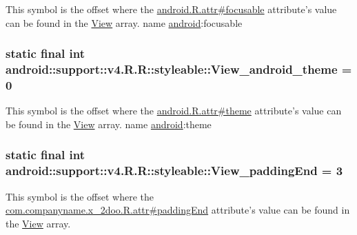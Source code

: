 This symbol is the offset where the \hyperlink{}{android.R.attr\#focusable} attribute's value can be found in the \hyperlink{classandroid_1_1support_1_1v4_1_1_r_1_1styleable_b4963d78f1fa8984188692ee48ea20d2}{View} array.  name \hyperlink{namespaceandroid}{android}:focusable \hypertarget{classandroid_1_1support_1_1v4_1_1_r_1_1styleable_26f4118fb592f19ebed8ecd1a890f65e}{
\subsubsection[{View\_\-android\_\-theme}]{\setlength{\rightskip}{0pt plus 5cm}static final int android::support::v4.R.R::styleable::View\_\-android\_\-theme = 0}}
\label{classandroid_1_1support_1_1v4_1_1_r_1_1styleable_26f4118fb592f19ebed8ecd1a890f65e}


This symbol is the offset where the \hyperlink{}{android.R.attr\#theme} attribute's value can be found in the \hyperlink{classandroid_1_1support_1_1v4_1_1_r_1_1styleable_b4963d78f1fa8984188692ee48ea20d2}{View} array.  name \hyperlink{namespaceandroid}{android}:theme \hypertarget{classandroid_1_1support_1_1v4_1_1_r_1_1styleable_d641d27f14bbb0e085ee8f2086bfe3ee}{
\subsubsection[{View\_\-paddingEnd}]{\setlength{\rightskip}{0pt plus 5cm}static final int android::support::v4.R.R::styleable::View\_\-paddingEnd = 3}}
\label{classandroid_1_1support_1_1v4_1_1_r_1_1styleable_d641d27f14bbb0e085ee8f2086bfe3ee}


This symbol is the offset where the \hyperlink{classcom_1_1companyname_1_1x__2doo_1_1_r_1_1attr_e008b68b7e8d36c17ebcdf24959ffed6}{com.companyname.x\_\-2doo.R.attr\#paddingEnd} attribute's value can be found in the \hyperlink{classandroid_1_1support_1_1v4_1_1_r_1_1styleable_b4963d78f1fa8984188692ee48ea20d2}{View} array.

